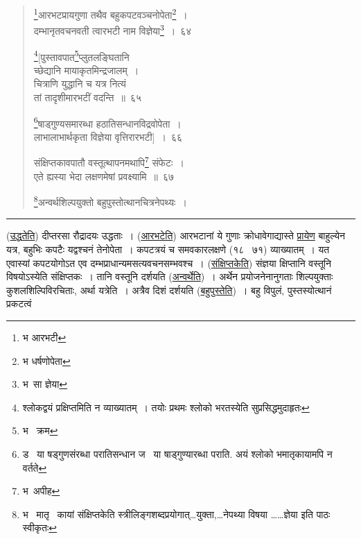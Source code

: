 \documentclass[11pt, openany]{book}
\begin{document}
\newpage

\begin{quote}
{\na \renewcommand{\thefootnote}{1}\footnote{भ आरभटी}आरभटप्रायगुणा तथैव बहुकपटवञ्चनोपेता\renewcommand{\thefootnote}{2}\footnote{भ धर्षणोपेता}~।\\
दम्भानृतवचनवती त्वारभटी नाम विज्ञेया\renewcommand{\thefootnote}{3}\footnote{भ\textendash\ सा ज्ञेया}~।~६४

\renewcommand{\thefootnote}{4}\footnote{श्लोकद्वयं प्रक्षिप्तमिति न व्याख्यातम्~। तयोः प्रथमः श्लोको भरतस्येति सुप्रसिद्धमुदाहृतः}[पुस्तावपात\renewcommand{\thefootnote}{5}\footnote{भ \textendash\ क्रम}प्लुतलङ्घितानि\\
च्छेद्यानि मायाकृतमिन्द्रजालम्~।\\
चित्राणि युद्धानि च यत्र नित्यं\\
तां तादृशीमारभटीं वदन्ति~॥~६५

\renewcommand{\thefootnote}{6}\footnote{ड \textendash\ या षड्गुणसंरब्धा परातिसन्धान ज \textendash\ या षाड्गुण्यारब्धा पराति. अयं श्लोको भमातृकायामपि न वर्तते}षाड्गुण्यसमारब्धा हठातिसन्धानविद्रवोपेता~।\\
लाभालाभार्थकृता विज्ञेया वृत्तिरारभटी]~।~६६

संक्षिप्तकावपातौ वस्तूत्थापनमथापि\renewcommand{\thefootnote}{7}\footnote{भ\textendash\ अपीह} संफेटः~।\\
एते ह्यस्या भेदा लक्षणमेषां प्रवक्ष्यामि~॥~६७

\renewcommand{\thefootnote}{8}\footnote{भ \textendash\ मातृ \textendash\ कायां संक्षिप्तकेति स्त्रीलिङ्गशब्दप्रयोगात्\ldots {\qt युक्ता,\ldots नेपथ्या विषया \ldots \ldots ज्ञेया} इति पाठः स्वीकृतः }अन्वर्थशिल्पयुक्तो बहुपुस्तोत्थानचित्रनेपथ्यः~।}
\end{quote}

\hrule

\vspace{2mm}
(\underline{उद्धतेति}) दीप्तरसा रौद्रादयः उद्धताः~। (\underline{आरभटेति}) आरभटानां ये गुणाः क्रोधावेगाद्यास्ते \underline{प्रायेण} बाहुल्येन यत्र, बहुभिः कपटैः यद्वश्चनं तेनोपेता~। कपटत्रयं च समवकारलक्षणे (१८ \textendash\ ७१) व्याख्यातम्~। यत एवास्यां कपटयोगोऽत एव दम्भप्राधान्यमसत्यवचनसम्भवश्च~। (\underline{संक्षिप्तकेति}) संज्ञया क्षिप्तानि वस्तूनि विषयोऽस्येति संक्षिप्तकः~। तानि वस्तूनि दर्शयति (\underline{अन्वर्थेति})~। अर्थेन प्रयोजनेनानुगताः शिल्पयुक्ताः कुशलशिल्पिविरचिताः, अर्था यत्रेति~। अत्रैव दिशं दर्शयति (\underline{बहुपुस्तेति})~। बहु विपुलं, पुस्तस्योत्थानं प्रकटत्वं

\newpage
\end{document}
